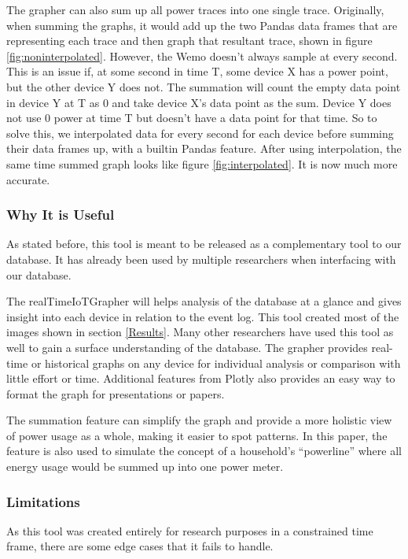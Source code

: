 The grapher can also sum up all power traces into one single trace. Originally, when summing the graphs, it would add up the two Pandas data frames that are representing each trace and then graph that resultant trace, shown in figure \ref{fig:noninterpolated}. However, the Wemo doesn't always sample at every second. This is an issue if, at some second in time T, some device X has a power point, but the other device Y does not. The summation will count the empty data point in device Y at T as 0 and take device X's data point as the sum. Device Y does not use 0 power at time T but doesn't have a data point for that time. So to solve this, we interpolated data for every second for each device before summing their data frames up, with a builtin Pandas feature. After using interpolation, the same time summed graph looks like figure \ref{fig:interpolated}. It is now much more accurate.

\subsubsection{Why It is Useful}
As stated before, this tool is meant to be released as a complementary tool to our database. It has already been used by multiple researchers when interfacing with our database.

The realTimeIoTGrapher will helps analysis of the database at a glance and gives insight into each device in relation to the event log.  This tool created most of the images shown in section \ref{Results}. Many other researchers have used this tool as well to gain a surface understanding of the database. The grapher provides real-time or historical graphs on any device for individual analysis or comparison with little effort or time. Additional features from Plotly also provides an easy way to format the graph for presentations or papers.

The summation feature can simplify the graph and provide a more holistic view of power usage as a whole, making it easier to spot patterns. In this paper, the feature is also used to simulate the concept of a household's ``powerline'' where all energy usage would be summed up into one power meter.

\subsubsection{Limitations}
As this tool was created entirely for research purposes in a constrained time frame, there are some edge cases that it fails to handle.


